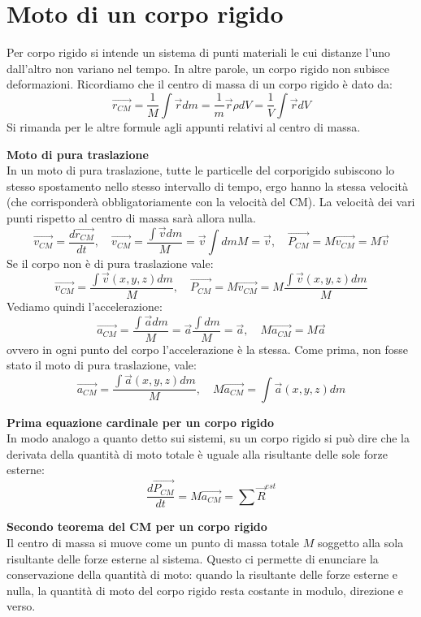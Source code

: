 \documentclass[a4paper,12pt]{article}
\begin{document}
\section{Moto di un corpo rigido}
Per corpo rigido si intende un sistema di punti materiali le cui distanze l'uno dall'altro non variano nel tempo. In
altre parole, un corpo rigido non subisce deformazioni.
Ricordiamo che il centro di massa di un corpo rigido è dato da:
$$ \vec{r_{CM}} = \frac{1}{M}\int\vec{r}dm = \frac{1}{m}\vec{r}\rho dV = \frac{1}{V}\int \vec{r} dV $$
Si rimanda per le altre formule agli appunti relativi al centro di massa.
\par\smallskip
\textbf{Moto di pura traslazione} \\
In un moto di pura traslazione, tutte le particelle del corporigido subiscono lo stesso spostamento nello stesso intervallo
di tempo, ergo hanno la stessa velocità (che corrisponderà obbligatoriamente con la velocità del CM). La velocità dei vari
punti rispetto al centro di massa sarà allora nulla.
$$ \vec{v_{CM}} = \frac{d\vec{r_{CM}}}{dt},\quad \vec{v_{CM}} = \frac{\int \vec{v} dm}{M} = \vec{v}{\int dm} {M} = \vec{v}, \quad \vec{P_{CM}} = M\vec{v_{CM}} = M\vec{v} $$
Se il corpo non è di pura traslazione vale:
$$ \vec{v_{CM}} = \frac{\int \vec{v}(x,y,z)dm}{M}, \quad \vec{P_{CM}} = M\vec{v_{CM}} = M\frac{\int \vec{v}(x,y,z)dm}{M} $$
Vediamo quindi l'accelerazione:
$$ \vec{a_{CM}} = \frac{\int \vec{a}dm}{M} = \vec{a} \frac{\int dm}{M} = \vec{a}, \quad M\vec{a_{CM}} = M\vec{a}$$
ovvero in ogni punto del corpo l'accelerazione è la stessa. Come prima, non fosse stato il moto di pura traslazione, vale:
$$ \vec{a_{CM}} = \frac{\int \vec{a}(x,y,z)dm}{M}, \quad M\vec{a_{CM}} = \int \vec{a}(x,y,z)dm $$
\par\smallskip
\textbf{Prima equazione cardinale per un corpo rigido} \\
In modo analogo a quanto detto sui sistemi, su un corpo rigido si può dire che la derivata della quantità di moto
totale è uguale alla risultante delle sole forze esterne:
$$ \frac{d\vec{P_{CM}}}{dt} = M\vec{a_{CM}} = \sum \vec{R}^{est} $$
\par\smallskip
\textbf{Secondo teorema del CM per un corpo rigido} \\
Il centro di massa si muove come un punto di massa totale $M$ soggetto alla sola risultante delle forze esterne al 
sistema. Questo ci permette di enunciare la conservazione della quantità di moto: quando la risultante delle forze esterne e nulla,
la quantità di moto del corpo rigido resta costante in modulo, direzione e verso.
\end{document}
